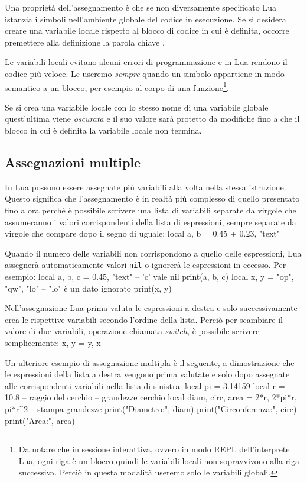 Una proprietà dell'assegnamento è che se non diversamente specificato Lua
istanzia i simboli nell'ambiente globale del codice in esecuzione. Se si
desidera creare una variabile locale rispetto al blocco di codice in cui è
definita, occorre premettere alla definizione la parola chiave .

Le variabili locali evitano alcuni errori di programmazione e in Lua rendono il
codice più veloce. Le useremo \emph{sempre} quando un simbolo appartiene in modo
semantico a un blocco, per esempio al corpo di una funzione\footnote{Da notare
che in sessione interattiva, ovvero in modo REPL dell'interprete Lua, ogni riga
è un blocco quindi le variabili locali non sopravvivono alla riga successiva.
Perciò in questa modalità useremo solo le variabili globali.}.

Se si crea una variabile locale con lo stesso nome di una variabile globale
quest'ultima viene \emph{oscurata} e il suo valore sarà protetto da modifiche
fino a che il blocco in cui è definita la variabile locale non termina.


\subsection{Assegnazioni multiple}

In Lua possono essere assegnate più variabili alla volta nella stessa
istruzione. Questo significa che l'assegnamento è in realtà più complesso di
quello presentato fino a ora perché è possibile scrivere una lista di variabili
separate da virgole che assumeranno i valori corrispondenti della lista di
espressioni, sempre separate da virgole che compare dopo il segno di uguale:
\lines
local a, b = 0.45 + 0.23, "text"
\endlines
{}

Quando il numero delle variabili non corrispondono a quello delle espressioni,
Lua assegnerà automaticamente valori \texttt{nil} o ignorerà le espressioni in
eccesso. Per esempio:
\lines
local a, b, c = 0.45, "text"    -- 'c' vale nil
print(a, b, c)
local x, y = "op", "qw", "lo"   -- "lo" è un dato ignorato
print(x, y)
\endlines
{}

Nell'assegnazione Lua prima valuta le espressioni a destra e solo
successivamente crea le rispettive variabili secondo l'ordine della lista.
Perciò per scambiare il valore di due variabili, operazione chiamata
\emph{switch}, è possibile scrivere semplicemente:
\lines
x, y = y, x
\endlines
{}

Un ulteriore esempio di assegnazione multipla è il seguente, a dimostrazione
che le espressioni della lista a destra vengono prima valutate e solo dopo
assegnate alle corrispondenti variabili nella lista di sinistra:
\lines
local pi = 3.14159
local r = 10.8 -- raggio del cerchio
-- grandezze cerchio
local diam, circ, area = 2*r, 2*pi*r, pi*r^2
-- stampa grandezze
print("Diametro:", diam)
print("Circonferenza:", circ)
print("Area:", area)
\endlines
{}

